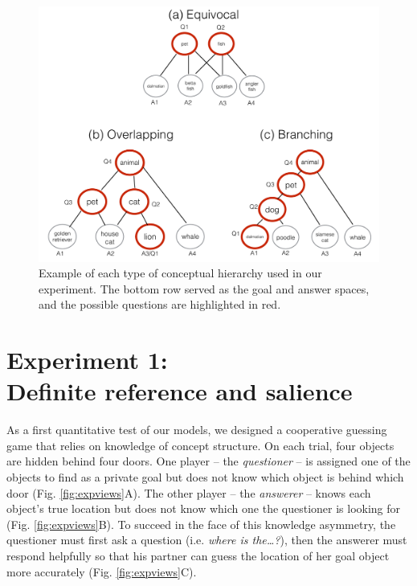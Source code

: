 \documentclass[12pt, floatsintext, jou]{apa6}
\begin{document}
\begin{figure}[th!]
\begin{center}
\includegraphics[scale = .5]{Exp1/hierarchyStructureExamples.pdf}
\end{center}
\caption{\footnotesize  Example of each type of conceptual hierarchy used in our experiment. The bottom row served as the goal and answer spaces, and the possible questions are highlighted in red. }
\label{fig:hierarchyStructures}
\end{figure}
\section{Experiment 1: \\ Definite reference and salience}

As a first quantitative test of our models, we designed a cooperative guessing game that relies on knowledge of concept structure. 
On each trial, four objects are hidden behind four doors.
One player -- the \emph{questioner} -- is assigned one of the objects to find as a private goal but does not know which object is behind which door (Fig. \ref{fig:expviews}A).
The other player -- the \emph{answerer} -- knows each object's true location but does not know which one the questioner is looking for (Fig. \ref{fig:expviews}B). 
To succeed in the face of this knowledge asymmetry, the questioner must first ask a question (i.e. \emph{where is the\dots?}), then the answerer must respond helpfully so that his partner can guess the location of her goal object more accurately (Fig. \ref{fig:expviews}C).
\end{document}
